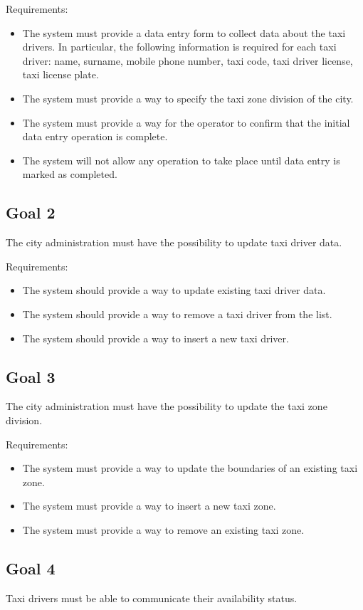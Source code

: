 Requirements:
\begin{itemize}
\item The system must provide a data entry form to collect data about the taxi drivers. In particular, the following information is required for each taxi driver: name, surname, mobile phone number, taxi code, taxi driver license, taxi license plate.
\item The system must provide a way to specify the taxi zone division of the city. 
\item The system must provide a way for the operator to confirm that the initial data entry operation is complete. 
\item The system will not allow any operation to take place until data entry is marked as completed. 
\end{itemize}


\subsection{Goal 2}
The city administration must have the possibility to update taxi driver data.

Requirements:
\begin{itemize}
\item The system should provide a way to update existing taxi driver data. 
\item The system should provide a way to remove a taxi driver from the list.
\item The system should provide a way to insert a new taxi driver.
\end{itemize}


\subsection{Goal 3}
The city administration must have the possibility to update the taxi zone division.

Requirements:
\begin{itemize}
\item The system must provide a way to update the boundaries of an existing taxi zone. 
\item The system must provide a way to insert a new taxi zone.
\item The system must provide a way to remove an existing taxi zone.
\end{itemize}


\subsection{Goal 4}
Taxi drivers must be able to communicate their availability status.

